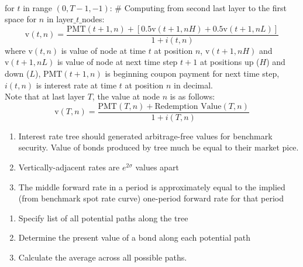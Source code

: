 \begin{method} \\
for $t$ in range $(0, T-1, -1)$: \# Computing from second last layer to the first \\
{\color{white}space} for $n$ in layer$\_t\_$nodes:
\begin{equation}
\text{v}(t,n) = \frac{\text{PMT}(t+1,n)+ [0.5 \text{v}(t+1, nH) + 0.5 \text{v}(t+1, nL)]}{1 + i(t, n)} \nonumber
\end{equation}
where $\text{v}(t,n)$ is value of node at time $t$ at position $n$, $\text{v}(t+1,nH)$ and $\text{v}(t+1,nL)$ is value of node at next time step $t+1$ at positions up ($H$) and down ($L$), $\text{PMT}(t+1,n)$ is beginning coupon payment for next time step, $i(t,n)$ is interest rate at time $t$ at position $n$ in decimal. \\
Note that at last layer $T$, the value at node $n$ is as follows:
\begin{equation}
\text{v}(T, n) = \frac{\text{PMT}(T,n) + \text{Redemption Value}(T,n)}{1 + i(T, n)} \nonumber
\end{equation}
\end{method}

\begin{remark} 
\begin{enumerate}[label=\roman*.]
\setlength{\itemsep}{0pt}
\item Interest rate tree should generated arbitrage-free values for benchmark security. Value of bonds produced by tree much be equal to their market pice.
\item Vertically-adjacent rates are $e^{2 \sigma}$ values apart
\item The middle forward rate in a period is approximately equal to the implied (from benchmark spot rate curve) one-period forward rate for that period
\end{enumerate}
\end{remark}

\begin{method} 
\begin{enumerate}[label=\roman*.]
\setlength{\itemsep}{0pt}
\item Specify list of all potential paths along the tree
\item Determine the present value of a bond along each potential path
\item Calculate the average across all possible paths.
\end{enumerate}
\end{method}

